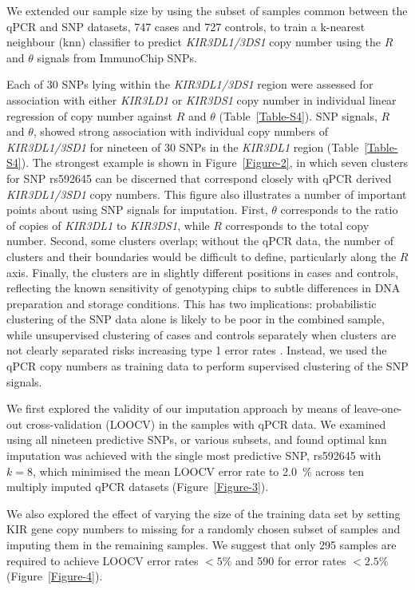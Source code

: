 We extended our sample size by using the subset of samples common between the qPCR and SNP datasets, 747 cases and 727 controls, to train a k-nearest neighbour (knn) classifier to predict \emph{KIR3DL1/3DS1} copy number using the $R$ and $\theta$ signals from ImmunoChip SNPs.

Each of 30 SNPs lying within the \emph{KIR3DL1/3DS1} region were assessed for association with either \emph{KIR3LD1} or \emph{KIR3DS1} copy number in individual linear regression of copy number against $R$ and $\theta$ (Table~\ref{Table-S4}).
SNP signals, $R$ and $\theta$, showed strong association with individual copy numbers of \emph{KIR3DL1/3SD1} for nineteen of 30 SNPs in the \emph{KIR3DL1} region (Table~\ref{Table-S4}).
The strongest example is shown in Figure~\ref{Figure-2}, in which seven clusters for SNP rs592645 can be discerned that correspond closely with qPCR derived \emph{KIR3DL1/3SD1} copy numbers.
This figure also illustrates a number of important points about using SNP signals for imputation.
First, $\theta$ corresponds to the ratio of copies of \emph{KIR3DL1} to \emph{KIR3DS1}, while $R$ corresponds to the total copy number.
Second, some clusters overlap; without the qPCR data, the number of clusters and their boundaries would be difficult to define, particularly along the $R$ axis.
Finally, the clusters are in slightly different positions in cases and controls, reflecting the known sensitivity of genotyping chips to subtle differences in DNA preparation and storage conditions.
This has two implications: probabilistic clustering of the SNP data alone is likely to be poor in the combined sample, while unsupervised clustering of cases and controls separately when clusters are not clearly separated risks increasing type 1 error rates \citep{Plagnol:2007dw}.
Instead, we used the qPCR copy numbers as training data to perform supervised clustering of the SNP signals.

We first explored the validity of our imputation approach by means of leave-one-out cross-validation (LOOCV) in the samples with qPCR data.
We examined using all nineteen predictive SNPs, or various subsets, and found optimal knn imputation was achieved with the single most predictive SNP, rs592645 with $k=8$, which minimised the mean LOOCV error rate to \SI{2.0}{\percent} across ten multiply imputed qPCR datasets (Figure~\ref{Figure-3}).  

We also explored the effect of varying the size of the training data set by setting KIR gene copy numbers to missing for a randomly chosen subset of samples and imputing them in the remaining samples.
We suggest that only 295 samples are required to achieve LOOCV error rates $<5\%$ and 590 for error rates $<2.5\%$ (Figure~\ref{Figure-4}).


